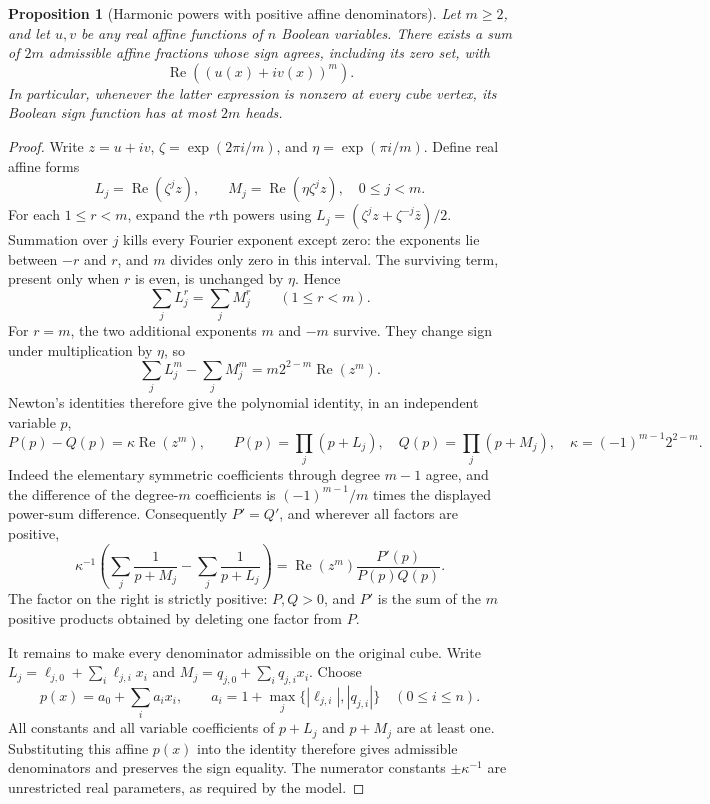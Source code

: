 \documentclass[11pt]{article}
\newtheorem{proposition}{Proposition}
\begin{document}
\begin{proposition}[Harmonic powers with positive affine denominators]
Let $m\geq2$, and let $u,v$ be any real affine functions of $n$ Boolean
variables. There exists a sum of $2m$ admissible affine fractions whose
sign agrees, including its zero set, with
\[
 \operatorname{Re}((u(x)+iv(x))^m).
\]
In particular, whenever the latter expression is nonzero at every cube
vertex, its Boolean sign function has at most $2m$ heads.
\end{proposition}
\begin{proof}
Write $z=u+iv$, $\zeta=\exp(2\pi i/m)$, and
$\eta=\exp(\pi i/m)$. Define real affine forms
\[
 L_j=\operatorname{Re}(\zeta^jz),\qquad
 M_j=\operatorname{Re}(\eta\zeta^jz),\quad 0\leq j<m.
\]
For each $1\leq r<m$, expand the $r$th powers using
$L_j=(\zeta^jz+\zeta^{-j}\bar z)/2$. Summation over $j$ kills every
Fourier exponent except zero: the exponents lie between $-r$ and $r$,
and $m$ divides only zero in this interval. The surviving term, present
only when $r$ is even, is unchanged by $\eta$. Hence
\[
 \sum_j L_j^r=\sum_j M_j^r\qquad(1\leq r<m).
\]
For $r=m$, the two additional exponents $m$ and $-m$ survive.
They change sign under multiplication by $\eta$, so
\[
 \sum_j L_j^m-\sum_j M_j^m
   =m2^{2-m}\operatorname{Re}(z^m).
\]
Newton's identities therefore give the polynomial identity, in an
independent variable $p$,
\[
 P(p)-Q(p)=\kappa\operatorname{Re}(z^m),\qquad
 P(p)=\prod_j(p+L_j),\quad Q(p)=\prod_j(p+M_j),\quad
 \kappa=(-1)^{m-1}2^{2-m}.
\]
Indeed the elementary symmetric coefficients through degree $m-1$
agree, and the difference of the degree-$m$ coefficients is
$(-1)^{m-1}/m$ times the displayed power-sum difference.
Consequently $P'=Q'$, and wherever all factors are positive,
\[
 \kappa^{-1}\left(\sum_j\frac1{p+M_j}
                    -\sum_j\frac1{p+L_j}\right)
 =\operatorname{Re}(z^m)\frac{P'(p)}{P(p)Q(p)}.
\]
The factor on the right is strictly positive: $P,Q>0$, and $P'$ is
the sum of the $m$ positive products obtained by deleting one factor
from $P$.

It remains to make every denominator admissible on the original cube.
Write $L_j=\ell_{j,0}+\sum_i\ell_{j,i}x_i$ and
$M_j=q_{j,0}+\sum_iq_{j,i}x_i$. Choose
\[
 p(x)=a_0+\sum_i a_i x_i,\qquad
 a_i=1+\max_j\{ |\ell_{j,i}|,|q_{j,i}|\}\quad(0\leq i\leq n).
\]
All constants and all variable coefficients of $p+L_j$ and $p+M_j$
are at least one. Substituting this affine $p(x)$ into the identity
therefore gives admissible denominators and preserves the sign equality.
The numerator constants $\pm\kappa^{-1}$ are unrestricted real
parameters, as required by the model.
\end{proof}
\end{document}
